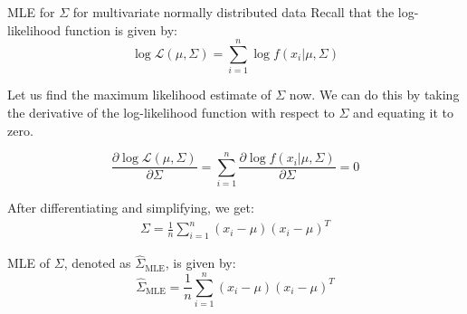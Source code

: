\documentclass{beamer}
\begin{document}
\begin{frame}{MLE for $\Sigma$ for multivariate normally distributed data}
    Recall that the log-likelihood function is given by:
    \begin{equation}
        \log \mathcal{L}(\mu, \Sigma) = \sum_{i=1}^n \log f(x_i|\mu, \Sigma)
    \end{equation}

    Let us find the maximum likelihood estimate of $\Sigma$ now. We can do this by taking the derivative of the log-likelihood function with respect to $\Sigma$ and equating it to zero.   

    \begin{equation}
        \frac{\partial \log \mathcal{L}(\mu, \Sigma)}{\partial \Sigma} = \sum_{i=1}^n \frac{\partial \log f(x_i|\mu, \Sigma)}{\partial \Sigma} = 0
    \end{equation}
    
\end{frame}
\begin{frame}
    After differentiating and simplifying, we get:
    \begin{align*}
      \Sigma = \frac{1}{n}\sum_{i=1}^n(x_i-\mu)(x_i-\mu)^T  
    \end{align*} 

    \begin{tcolorbox}[colback=metropolisblue!5,colframe=metropolisblue,title=Maximum Likelihood Estimate for $\Sigma$]
        MLE of $\Sigma$, denoted as $\hat{\Sigma}_{\text{MLE}}$, is given by:
        \begin{equation*}
            \hat{\Sigma}_{\text{MLE}} = \frac{1}{n}\sum_{i=1}^n (x_i-\mu)(x_i-\mu)^T
        \end{equation*}
    \end{tcolorbox}
\end{frame}
\end{document}
